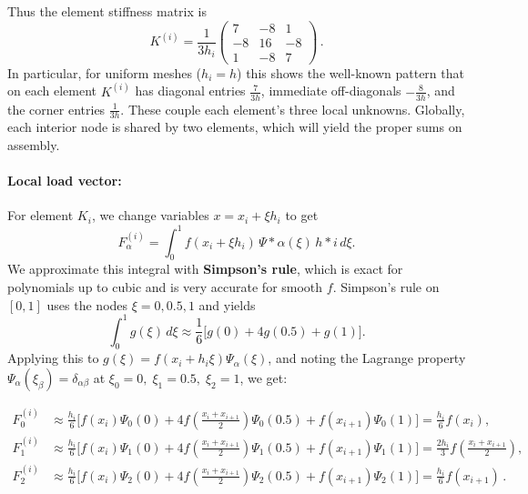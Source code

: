 \documentclass[a4paper,10pt]{article}
\begin{document}
Thus the element stiffness matrix is
\[
	K^{(i)} = \frac{1}{3 h_i}
	\begin{pmatrix}
		7  & -8 & 1  \\
		-8 & 16 & -8 \\
		1  & -8 & 7
	\end{pmatrix}\,.
\]
In particular, for uniform meshes (\(h_i=h\)) this shows the well-known pattern that on each element \(K^{(i)}\) has diagonal entries \(\frac{7}{3h}\), immediate off-diagonals \(-\frac{8}{3h}\), and the corner entries \(\frac{1}{3h}\).
These couple each element's three local unknowns.
Globally, each interior node is shared by two elements, which will yield the proper sums on assembly.

\paragraph{Local load vector:} For element \(K_i\), we change variables \(x = x_i + \xi h_i\) to get
\[
	F^{(i)}_\alpha = \int_{0}^{1} f(x_i + \xi h_i)\,\Psi*\alpha(\xi)\,h*i\,d\xi.
\]
We approximate this integral with \textbf{Simpson's rule}, which is exact for polynomials up to cubic and is very accurate for smooth \(f\).
Simpson's rule on \([0,1]\) uses the nodes \(\xi=0,0.5,1\) and yields
\[
	\int_{0}^{1} g(\xi)\,d\xi \approx \frac{1}{6}\Big[g(0)+4g(0.5)+g(1)\Big].
\]
Applying this to \(g(\xi)=f(x_i+h_i\xi)\Psi_\alpha(\xi)\), and noting the Lagrange property \(\Psi_\alpha(\xi_{\beta})=\delta_{\alpha\beta}\) at \(\xi_0=0,\;\xi_1=0.5,\;\xi_2=1\), we get:

\begin{align*}
	F^{(i)}_0 & \approx \frac{h_i}{6}\big[f(x_i)\Psi_0(0) + 4f(\tfrac{x_i+x_{i+1}}{2})\Psi_0(0.5)+f(x_{i+1})\Psi_0(1)\big] = \frac{h_i}{6} f(x_i),                                 \\
	F^{(i)}_1 & \approx \frac{h_i}{6}\big[f(x_i)\Psi_1(0) + 4f(\tfrac{x_i+x_{i+1}}{2})\Psi_1(0.5)+f(x_{i+1})\Psi_1(1)\big] = \frac{2h_i}{3} f\!\left(\frac{x_i+x_{i+1}}{2}\right), \\
	F^{(i)}_2 & \approx \frac{h_i}{6}\big[f(x_i)\Psi_2(0) + 4f(\tfrac{x_i+x_{i+1}}{2})\Psi_2(0.5)+f(x_{i+1})\Psi_2(1)\big] = \frac{h_i}{6} f(x_{i+1})\,.
\end{align*}
\end{document}

